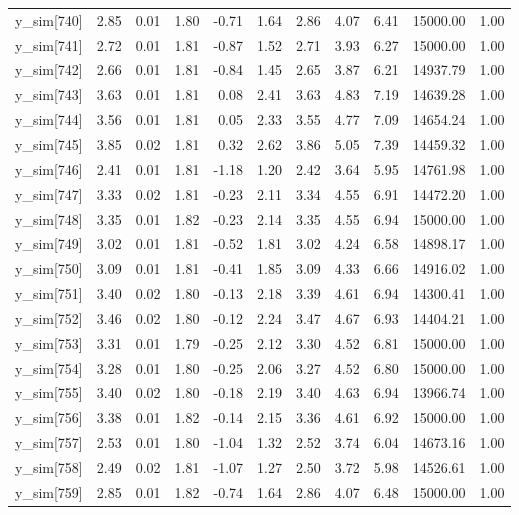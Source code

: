 \begin{table}[ht]
\begin{tabular}{rrrrrrrrrrr}
  y\_sim[740] & 2.85 & 0.01 & 1.80 & -0.71 & 1.64 & 2.86 & 4.07 & 6.41 & 15000.00 & 1.00 \\ 
  y\_sim[741] & 2.72 & 0.01 & 1.81 & -0.87 & 1.52 & 2.71 & 3.93 & 6.27 & 15000.00 & 1.00 \\ 
  y\_sim[742] & 2.66 & 0.01 & 1.81 & -0.84 & 1.45 & 2.65 & 3.87 & 6.21 & 14937.79 & 1.00 \\ 
  y\_sim[743] & 3.63 & 0.01 & 1.81 & 0.08 & 2.41 & 3.63 & 4.83 & 7.19 & 14639.28 & 1.00 \\ 
  y\_sim[744] & 3.56 & 0.01 & 1.81 & 0.05 & 2.33 & 3.55 & 4.77 & 7.09 & 14654.24 & 1.00 \\ 
  y\_sim[745] & 3.85 & 0.02 & 1.81 & 0.32 & 2.62 & 3.86 & 5.05 & 7.39 & 14459.32 & 1.00 \\ 
  y\_sim[746] & 2.41 & 0.01 & 1.81 & -1.18 & 1.20 & 2.42 & 3.64 & 5.95 & 14761.98 & 1.00 \\ 
  y\_sim[747] & 3.33 & 0.02 & 1.81 & -0.23 & 2.11 & 3.34 & 4.55 & 6.91 & 14472.20 & 1.00 \\ 
  y\_sim[748] & 3.35 & 0.01 & 1.82 & -0.23 & 2.14 & 3.35 & 4.55 & 6.94 & 15000.00 & 1.00 \\ 
  y\_sim[749] & 3.02 & 0.01 & 1.81 & -0.52 & 1.81 & 3.02 & 4.24 & 6.58 & 14898.17 & 1.00 \\ 
  y\_sim[750] & 3.09 & 0.01 & 1.81 & -0.41 & 1.85 & 3.09 & 4.33 & 6.66 & 14916.02 & 1.00 \\ 
  y\_sim[751] & 3.40 & 0.02 & 1.80 & -0.13 & 2.18 & 3.39 & 4.61 & 6.94 & 14300.41 & 1.00 \\ 
  y\_sim[752] & 3.46 & 0.02 & 1.80 & -0.12 & 2.24 & 3.47 & 4.67 & 6.93 & 14404.21 & 1.00 \\ 
  y\_sim[753] & 3.31 & 0.01 & 1.79 & -0.25 & 2.12 & 3.30 & 4.52 & 6.81 & 15000.00 & 1.00 \\ 
  y\_sim[754] & 3.28 & 0.01 & 1.80 & -0.25 & 2.06 & 3.27 & 4.52 & 6.80 & 15000.00 & 1.00 \\ 
  y\_sim[755] & 3.40 & 0.02 & 1.80 & -0.18 & 2.19 & 3.40 & 4.63 & 6.94 & 13966.74 & 1.00 \\ 
  y\_sim[756] & 3.38 & 0.01 & 1.82 & -0.14 & 2.15 & 3.36 & 4.61 & 6.92 & 15000.00 & 1.00 \\ 
  y\_sim[757] & 2.53 & 0.01 & 1.80 & -1.04 & 1.32 & 2.52 & 3.74 & 6.04 & 14673.16 & 1.00 \\ 
  y\_sim[758] & 2.49 & 0.02 & 1.81 & -1.07 & 1.27 & 2.50 & 3.72 & 5.98 & 14526.61 & 1.00 \\ 
  y\_sim[759] & 2.85 & 0.01 & 1.82 & -0.74 & 1.64 & 2.86 & 4.07 & 6.48 & 15000.00 & 1.00 \\ 

\end{tabular}
\end{table}
